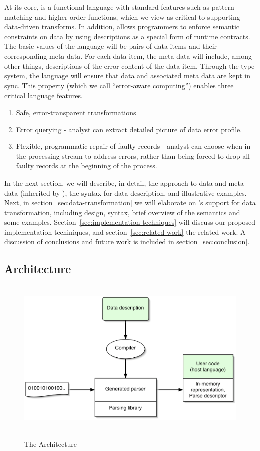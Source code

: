 \documentclass{entcs}
\begin{document}
At its core, \datatype{} is a functional language with standard
features such as pattern matching and higher-order functions, which we
view as critical to supporting data-driven transforms. In addition,
\datatype{} allows programmers to enforce semantic constraints on
data by using \datatype{} descriptions as a special form of runtime
contracts. The basic values of the language will be pairs of data
items and their corresponding meta-data. For each data item, the meta
data will include, among other things, descriptions of the error
content of the data item. Through the type system, the language will
ensure that data and associated meta data are kept in sync. This
property (which we call ``error-aware computing'') enables three
critical language features.
\begin{enumerate}
\item Safe, error-transparent transformations
\item Error querying - analyst can extract detailed picture of data
  error profile.
\item Flexible, programmatic repair of faulty records - analyst can
  choose when in the processing stream to address errors, rather than
  being forced to drop all faulty records at the beginning of the process.
\end{enumerate}

In the next section, we will describe, in detail, the \pads{} approach
to data and meta data (inherited by \datatype{}), the \datatype{}
syntax for data description, and illustrative examples. Next, in
section~\ref{sec:data-transformation} we will elaborate on
\datatype{}'s support for data transformation, including design,
syntax, brief overview of the semantics and some examples.
Section~\ref{sec:implementation-techniques} will discuss our proposed
implementation techiniques, and section~\ref{sec:related-work} the
related work. A discussion of conclusions and future work is included
in section~\ref{sec:conclusion}.


\subsection{Architecture}

\begin{figure}[tp]
  \includegraphics[height=3in,width=5in]{architecture.eps}
\label{fig:pads-arch}
\caption{The \pads{} Architecture}
\end{figure}
\end{document}
